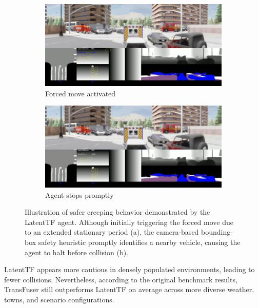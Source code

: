 \begin{figure}[htbp]
    \centering
    \begin{subfigure}[b]{0.45\textwidth}
        \centering
        \includegraphics[width=\columnwidth]{images/latend_forced1.png}
        \caption{Forced move activated}
        \label{fig:latent_forcedmove_a}
    \end{subfigure}
    \hfill
    \begin{subfigure}[b]{0.45\textwidth}
        \centering
        \includegraphics[width=\columnwidth]{images/latent_forced2.png}
        \caption{Agent stops promptly}
        \label{fig:latent_forcedmove_b}
    \end{subfigure}
    \caption{Illustration of safer creeping behavior demonstrated by the LatentTF agent. Although initially triggering the forced move due to an extended stationary period (a), the camera-based bounding-box safety heuristic promptly identifies a nearby vehicle, causing the agent to halt before collision (b).}
    \label{fig:latent_forced}
\end{figure}

LatentTF appears more cautious in densely populated environments, leading to fewer collisions. Nevertheless, according to the original benchmark results, TransFuser still outperforms LatentTF on average across more diverse weather, towns, and scenario configurations.

